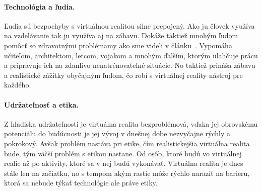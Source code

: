 \documentclass[10pt,oneside,slovak,a4paper]{article}
\begin{document}
\paragraph{Technológia a ľudia.}Ľudia sú bezpochyby s virtuálnou realitou silne prepojený. Ako ju človek využíva na vzdelávanie tak ju využíva aj na zábavu. Dokáže taktiež mnohým ľudom pomôcť so zdravotnými problémamy ako sme videli v článku~\cite{Autism}. Vypomáha učiteľom, architektom, letcom, vojakom a mnohým ďalším, ktorým ulahčuje prácu a pripravuje ich na zdanlivo nenatrénovateľné situácie. No taktiež prináša zábavu a realistické zážitky obyčajným ľudom, čo robí s virtuálnej reality nástroj pre každého. 

\paragraph{Udržateľnosť a etika.}Z hladiska udržateľnosti je virtuálna realita bezproblémová, vďaka jej obrovskému potenciálu do budúcnosti je jej vývoj v dnešnej dobe nezvyčajne rýchly a pokrokový. Avšak problém nastáva pri etike, čím realistickejšia virtuálna realita bude, tým väčší problém s etikou nastane. Od osôb, ktoré budú vo virtuálnej realie až po aktivity, ktoré sa v nej budú vykonávať. Virtuálna realita je dnes stále len na začiatku, no s tempom akým rastie môže rýchlo naraziť na barieru, ktorá sa nebude týkať technológie ale práve etiky. 




\end{document}
